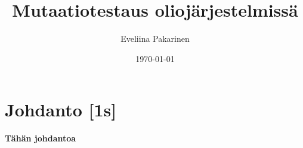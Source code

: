 \documentclass[finnish, grading]{tktltiki2}
\title{Mutaatiotestaus oliojärjestelmissä}
\author{Eveliina Pakarinen}
\date{\today}
\theoremstyle{definition}
\theoremstyle{remark}
\begin{document}

\frontmatter      %

\maketitle        %
\makeabstract     %

\tableofcontents  %


\mainmatter       %




\section{Johdanto [1s]}

\textbf{Tähän johdantoa}

%
%
%
\end{document}
